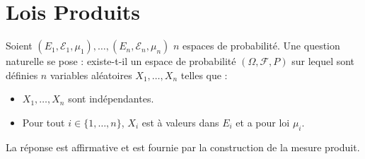 \section{Lois Produits}
Soient $(E_1, \mathcal{E}_1, \mu_1), \ldots, (E_n, \mathcal{E}_n, \mu_n)$ $n$ espaces de probabilité.
Une question naturelle se pose : existe-t-il un espace de probabilité $(\Omega, \mathcal{F}, P)$ sur lequel sont définies $n$ variables aléatoires $X_1, \ldots, X_n$ telles que :
\begin{itemize}
    \item $X_1, \ldots, X_n$ sont indépendantes.
    \item Pour tout $i \in \{1, \ldots, n\}$, $X_i$ est à valeurs dans $E_i$ et a pour loi $\mu_i$.
\end{itemize}
La réponse est affirmative et est fournie par la construction de la mesure produit.
